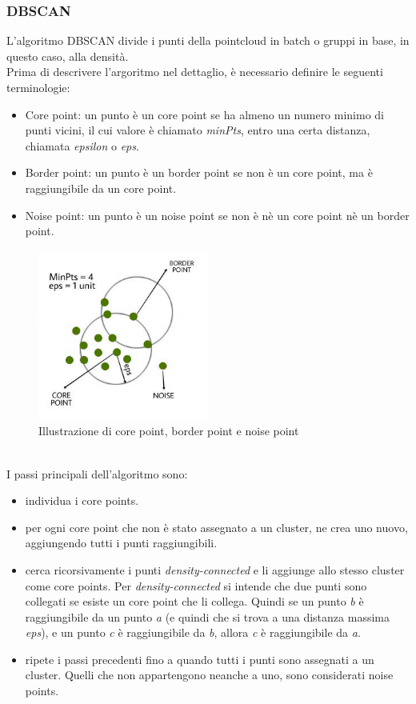 \documentclass[italian]{article}
\begin{document}
\subsubsection{DBSCAN}
L'algoritmo DBSCAN divide i punti della pointcloud in batch o gruppi in base, in questo caso, alla densità.\\
Prima di descrivere l'argoritmo nel dettaglio, è necessario definire le seguenti terminologie:
\begin{itemize}
	\item Core point: un punto è un core point se ha almeno un numero minimo di punti vicini, il cui valore è chiamato \textit{minPts}, entro una certa distanza, chiamata \textit{epsilon} o \textit{eps}.
	\item Border point: un punto è un border point se non è un core point, ma è raggiungibile da un core point.
	\item Noise point: un punto è un noise point se non è nè un core point nè un border point.
\end{itemize}
\begin{figure}[H]
	\centering
	\includegraphics[width=0.5\textwidth]{clustering}
	\footnotesize
	\caption{Illustrazione di core point, border point e noise point}
\end{figure}\\
I passi principali dell'algoritmo sono:
\begin{itemize}
	\item individua i core points.
	\item per ogni core point che non è stato assegnato a un cluster, ne crea uno nuovo, aggiungendo tutti i punti raggiungibili.
	\item cerca ricorsivamente i punti \textit{density-connected} e li aggiunge allo stesso cluster come core points. Per \textit{density-connected} si intende che due punti sono collegati se esiste un core point che li collega.		Quindi se un punto \textit{b} è raggiungibile da un punto \textit{a} (e quindi che si trova a una distanza massima \textit{eps}), e un punto \textit{c} è raggiungibile da \textit{b}, allora \textit{c} è raggiungibile da \textit{a}.
	\item ripete i passi precedenti fino a quando tutti i punti sono assegnati a un cluster. Quelli che non appartengono neanche a uno, sono considerati noise points.
\end{itemize}
\end{document}
